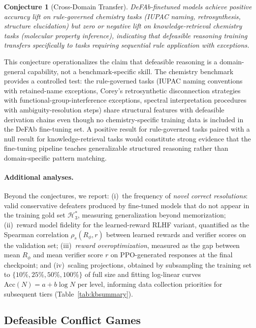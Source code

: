 \documentclass{article}
\newtheorem{conjecture}[theorem]{Conjecture}
\theoremstyle{definition}
\newcommand{\Rgold}{\mathcal{H}^{*}_3}
\begin{document}
\begin{conjecture}[Cross-Domain Transfer]\label{conj:transfer_chem}
DeFAb-finetuned models achieve positive accuracy lift on rule-governed chemistry tasks (IUPAC naming, retrosynthesis, structure elucidation) but zero or negative lift on knowledge-retrieval chemistry tasks (molecular property inference), indicating that defeasible reasoning training transfers specifically to tasks requiring sequential rule application with exceptions.
\end{conjecture}

This conjecture operationalizes the claim that defeasible reasoning is a domain-general capability, not a benchmark-specific skill. The chemistry benchmark provides a controlled test: the rule-governed tasks (IUPAC naming conventions with retained-name exceptions, Corey's retrosynthetic disconnection strategies with functional-group-interference exceptions, spectral interpretation procedures with ambiguity-resolution steps) share structural features with defeasible derivation chains even though no chemistry-specific training data is included in the DeFAb fine-tuning set. A positive result for rule-governed tasks paired with a null result for knowledge-retrieval tasks would constitute strong evidence that the fine-tuning pipeline teaches generalizable structured reasoning rather than domain-specific pattern matching.

\paragraph{Additional analyses.} Beyond the conjectures, we report: (i)~the frequency of \emph{novel correct resolutions}: valid conservative defeaters produced by fine-tuned models that do not appear in the training gold set $\Rgold$, measuring generalization beyond memorization; (ii)~reward model fidelity for the learned-reward RLHF variant, quantified as the Spearman correlation $\rho_s(R_\phi, r)$ between learned rewards and verifier scores on the validation set; (iii)~\emph{reward overoptimization}, measured as the gap between mean $R_\phi$ and mean verifier score $r$ on PPO-generated responses at the final checkpoint; and (iv)~scaling projections, obtained by subsampling the training set to $\{10\%, 25\%, 50\%, 100\%\}$ of full size and fitting log-linear curves $\mathrm{Acc}(N) = a + b \log N$ per level, informing data collection priorities for subsequent tiers (Table~\ref{tab:kbsummary}).


\subsection{Defeasible Conflict Games}\label{subsec:conflict_games}
\end{document}

